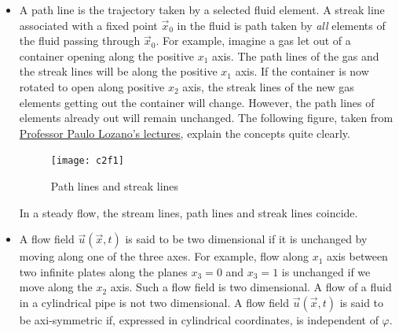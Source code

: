 \begin{itemize}
\item A path line is the trajectory taken by a selected fluid element. A streak line associated with a fixed point $\vec{x}_0$ in the fluid is path taken by \emph{all} elements of the 
fluid passing through $\vec{x}_0$. For example, imagine a gas let out of a container opening along the positive $x_1$ axis. The path lines of the gas and the streak lines will be along 
the positive $x_1$ axis. If the container is now rotated to open along positive $x_2$ axis, the streak lines of the new gas elements getting out the container will change. However, the 
path lines of elements already out will remain unchanged. The following figure, taken from \href{http://web.mit.edu/16.unified/www/FALL/fluids/Lectures/f08.pdf}{Professor Paulo Lozano's 
lectures}, explain the concepts quite clearly.
\begin{figure}[!ht]
\centering
\centerline{\texttt{[image: c2f1]}}
\caption{Path lines and streak lines}
\label{c2f1}
\end{figure}
In a steady flow, the stream lines, path lines and streak lines coincide.

\item A flow field $\vec{u}(\vec{x}, t)$ is said to be two dimensional if it is unchanged by moving along one of the three axes. For example, flow along $x_1$ axis between two infinite
plates along the planes $x_3 = 0$ and $x_3 = 1$ is unchanged if we move along the $x_2$ axis. Such a flow field is two dimensional. A flow of a fluid in a cylindrical pipe is not two
dimensional. A flow field $\vec{u}(\vec{x}, t)$ is said to be axi-symmetric if, expressed in cylindrical coordinates, is independent of $\varphi$.


\end{itemize}

